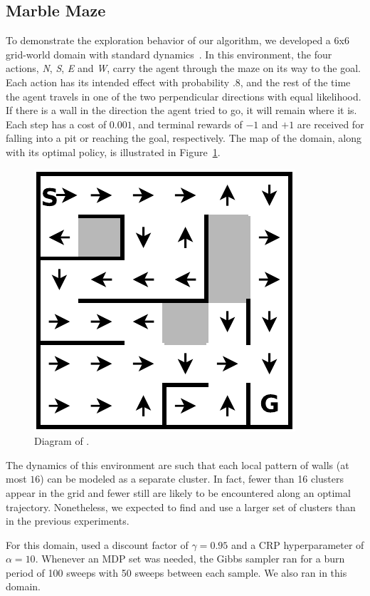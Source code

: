 \subsection{Marble Maze}


To demonstrate the exploration behavior of our algorithm, we developed a
6x6 grid-world domain with standard dynamics~\cite{russell94}.  In this environment, the four actions,
\emph{N}, \emph{S}, \emph{E} and \emph{W}, carry the
agent through the maze on its way to the goal.  Each action has its
intended effect with probability .8, and the rest of the time the
agent travels in one of the two perpendicular directions with
equal likelihood.  If there is a wall in the direction the agent tried
to go, it will remain where it is.  Each step has a cost of $0.001$, and
terminal rewards of $-1$ and $+1$ are received for falling into a pit or
reaching the goal, respectively.  The map of the domain, along with
its optimal policy, is illustrated in Figure~\ref{f:marble}.

\begin{figure}[t]
\begin{center}
\includegraphics[width=0.6\linewidth]{6x6_maze}
\caption{Diagram of .}
\label{f:marble}
\end{center}
\end{figure}

The dynamics of this environment are such that each local pattern of
walls (at most $16$) can be modeled as a separate cluster.  In fact,
fewer than 16 clusters appear in the grid and fewer still are likely
to be encountered along an optimal trajectory.  Nonetheless, we
expected  to find and use a larger set of clusters than in the
previous experiments.

For this domain,  used a discount factor of $\gamma=0.95$ and a
CRP hyperparameter of $\alpha=10$.  Whenever an MDP set was needed,
the Gibbs sampler ran for a burn period of 100 sweeps with 50 sweeps
between each sample.  We also ran  in this domain.

